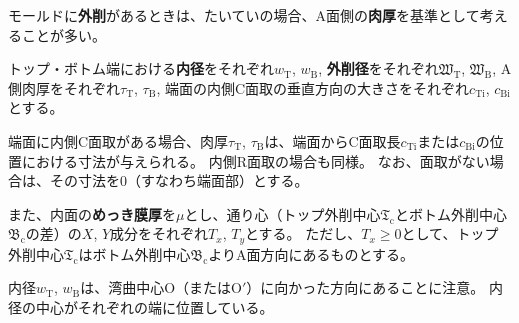 

モールドに\textbf{外削}があるときは、たいていの場合、A面側の\textbf{肉厚}を基準として考えることが多い。

トップ・ボトム端における\textbf{内径}をそれぞれ$w_\mathrm T$, $w_\mathrm B$, \textbf{外削径}をそれぞれ$\mathfrak W_\mathrm T$, $\mathfrak W_\mathrm B$, A側肉厚をそれぞれ$\tau_\mathrm T$, $\tau_\mathrm B$, 端面の内側C面取の垂直方向の大きさをそれぞれ$c_\mathrm{Ti}$, $c_\mathrm{Bi}$とする。
\begin{hosoku}
端面に内側C面取がある場合、肉厚$\tau_\mathrm T$, $\tau_\mathrm B$は、端面からC面取長$c_\mathrm{Ti}$または$c_\mathrm{Bi}$の位置における寸法が与えられる。
内側R面取の場合も同様。
なお、面取がない場合は、その寸法を0（すなわち端面部）とする。
\end{hosoku}
また、内面の\textbf{めっき膜厚}を$\mu$とし、通り心（トップ外削中心$\mathfrak T_\mathrm c$とボトム外削中心$\mathfrak B_\mathrm c$の差）の$X$, $Y$成分をそれぞれ$T_x$, $T_y$とする。
ただし、$T_x \geq 0$として、トップ外削中心$\mathfrak T_\mathrm c$はボトム外削中心$\mathfrak B_\mathrm c$よりA面方向にあるものとする。
\begin{hosoku}
内径$w_\mathrm T$, $w_\mathrm B$は、湾曲中心O（またはO$'$）に向かった方向にあることに注意。
内径の中心がそれぞれの端に位置している。
\end{hosoku}




